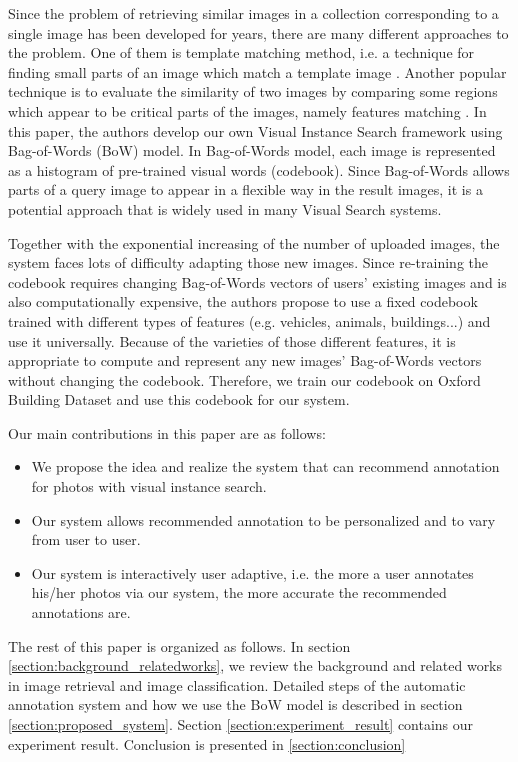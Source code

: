 Since the problem of retrieving similar images in a collection corresponding to a single image has been developed for years, there are many different approaches to the problem. One of them is template matching method, i.e. a technique for finding small parts of an image which match a template image \cite{brunelli_template_matching,Rosenfeld4309663,Gharavi913587}. Another popular technique is to evaluate the similarity of two images by comparing some regions which appear to be critical parts of the images, namely features matching \cite{Belongie710790,Rubner,Viola990517}. In this paper, the authors develop our own Visual Instance Search framework using Bag-of-Words (BoW) model. In Bag-of-Words model, each image is represented as a histogram of pre-trained visual words (codebook). Since Bag-of-Words allows parts of a query image to appear in a flexible way in the result images, it is a potential approach that is widely used in many Visual Search systems. 

Together with the exponential increasing of the number of uploaded images, the system faces lots of difficulty adapting those new images. Since re-training the codebook requires changing Bag-of-Words vectors of users' existing images and is also computationally expensive, the authors propose to use a fixed codebook trained with different types of features (e.g. vehicles, animals, buildings...) and use it universally. Because of the varieties of those different features, it is appropriate to compute and represent any new images' Bag-of-Words vectors without changing the codebook. Therefore, we train our codebook on Oxford Building Dataset and use this codebook for our system.

Our main contributions in this paper are as follows:
\begin{itemize}
	\item We propose the idea and realize the system that can recommend annotation for photos with visual instance search.
	\item Our system allows recommended annotation to be personalized and to vary from user to user.
	\item Our system is interactively user adaptive, i.e. the more a user annotates his/her photos via our system, the more accurate the recommended annotations are.
\end{itemize}

The rest of this paper is organized as follows. In section \ref{section:background_relatedworks}, we review the background and related works in image retrieval and image classification. Detailed steps of the automatic annotation system and how we use the BoW model is described in section \ref{section:proposed_system}. Section \ref{section:experiment_result} contains our experiment result. Conclusion is presented in \ref{section:conclusion}

